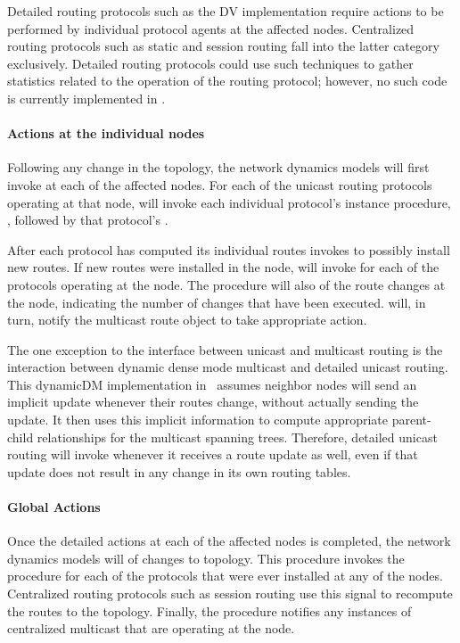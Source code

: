 Detailed routing protocols such as the DV implementation
require actions to be performed by individual protocol agents at the
affected nodes.
Centralized routing protocols such as static and session routing fall into
the latter category exclusively.
Detailed routing protocols could use such techniques to gather statistics
related to the operation of the routing protocol;
however, no such code is currently implemented in \ns.

\paragraph{Actions at the individual nodes}
Following any change in the topology,
the network dynamics models will first invoke
at each of the affected nodes.
For each of the unicast routing protocols operating at that node,
 will invoke 
each individual protocol's instance procedure,  ,
followed by that protocol's .

After each protocol has computed its individual routes
 invokes 
to possibly install new routes.
If new routes were installed in the node,
 will invoke
 for each of the protocols operating at the node.
The procedure will also
of the route changes at the node, indicating the number of changes 
that have been executed.
 will, in turn, notify
the multicast route object to take appropriate action.

The one exception
to the interface between unicast and multicast routing is the interaction
between dynamic dense mode multicast and detailed unicast routing.
This dynamicDM implementation in \ns\ assumes neighbor nodes
will send an implicit update whenever their routes change,
without actually sending the update.  
It then uses this implicit information to compute
appropriate parent-child relationships for the multicast spanning trees.
Therefore, detailed unicast routing will invoke
 whenever it receives a route update as well,
even if that update does not result in any change in its own routing tables.

\paragraph{Global Actions}
Once the detailed actions at each of the affected nodes is completed,
the network dynamics models will
of changes to topology.
This procedure invokes the procedure 
for each of the protocols that were ever installed at any of the nodes.
Centralized routing protocols such as session routing use this signal to
recompute the routes to the topology.
Finally, the  procedure notifies 
any instances of centralized multicast that are operating at the node.

